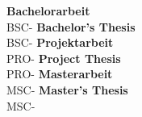%
%
\begin{titlepage}

\hspace{20mm}\begin{minipage}{0.3\linewidth}
			{
				{\textbf{Bachelorarbeit}\\
				\large{BSC-\NummerDerArbeit}}{}
			{\textbf{Bachelor's Thesis}\\
				\large{BSC-\NummerDerArbeit}}{}
			}{}
			{
				{\textbf{Projektarbeit}\\
				\large{PRO-\NummerDerArbeit}}{}
				{\textbf{Project Thesis}\\
				\large{PRO-\NummerDerArbeit}}{}
			}{}
			{
				{\textbf{Masterarbeit}\\
				\large{MSC-\NummerDerArbeit}}{}
				{\textbf{Master's Thesis}\\
				\large{MSC-\NummerDerArbeit}}{}
			}{}


\end{minipage}
\end{titlepage}
